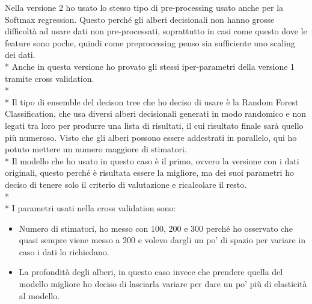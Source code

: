 Nella versione 2 ho usato lo stesso tipo di pre-processing usato anche per la Softmax regression. Questo perché gli alberi decisionali non hanno grosse difficoltà ad usare dati non pre-processati, soprattutto in casi come questo dove le feature sono poche, quindi come preprocessing penso sia sufficiente uno scaling dei dati. \\*
Anche in questa versione ho provato gli stessi iper-parametri della versione 1 tramite cross validation.\\*\\*
Il tipo di ensemble del decison tree che ho deciso di usare è la Random Forest Classification, che usa diversi alberi decisionali generati in modo randomico e non legati tra loro per produrre una lista di risultati, il cui risultato finale sarà quello più numeroso. Visto che gli alberi possono essere addestrati in parallelo, qui ho potuto mettere un numero maggiore di stimatori. \\*
Il modello che ho usato in questo caso è il primo, ovvero la versione con i dati originali, questo perché è risultata essere la migliore, ma dei suoi parametri ho deciso di tenere solo il criterio di valutazione e ricalcolare il resto.\\*\\*
I parametri usati nella cross validation sono:
\begin{itemize}
	\item Numero di stimatori, ho messo con 100, 200 e 300 perché ho osservato che quasi sempre viene messo a 200 e volevo dargli un po' di spazio per variare in caso i dati lo richiedano.
	\item La profondità degli alberi, in questo caso invece che prendere quella del modello migliore ho deciso di lasciarla variare per dare un po' più di elasticità al modello.
\end{itemize}

